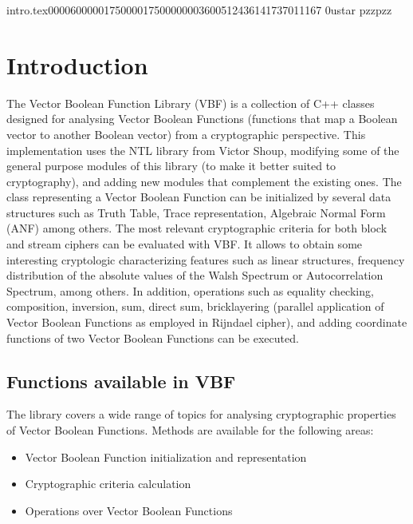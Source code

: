           intro.tex                                                                                           0000600 0001750 0001750 00000036005 12436141737 011167  0                                                                                                    ustar   pzz                             pzz                                                                                                                                                                                                                    ﻿
\chapter{Introduction}

The Vector Boolean Function Library (VBF) is a collection of C++ classes designed for analysing Vector Boolean Functions (functions that map a Boolean vector to another Boolean vector)  from a cryptographic perspective. This implementation uses the NTL library from Victor Shoup, modifying some of the general purpose modules of this library (to make it better suited to cryptography), and adding new modules that complement the existing ones. The class representing a Vector Boolean Function can be initialized by several data structures such as Truth Table, Trace representation, Algebraic Normal Form (ANF) among others. The most relevant cryptographic criteria for both block and stream ciphers can be evaluated with VBF. It allows to obtain some interesting cryptologic characterizing features such as linear structures, frequency distribution of the absolute values of the Walsh Spectrum or Autocorrelation Spectrum, among others. In addition, operations such as equality checking, composition, inversion, sum, direct sum, bricklayering (parallel application of Vector Boolean Functions as employed in Rijndael cipher), and adding coordinate functions of  two Vector Boolean Functions can be executed. 

\section{Functions available in VBF}\label{sec:Functions}

The library covers a wide range of topics for analysing cryptographic properties
of Vector Boolean Functions. Methods are available for the following areas:

\begin{itemize}
\item Vector Boolean Function initialization and representation
\item Cryptographic criteria calculation
\item Operations over Vector Boolean Functions
\end{itemize}

